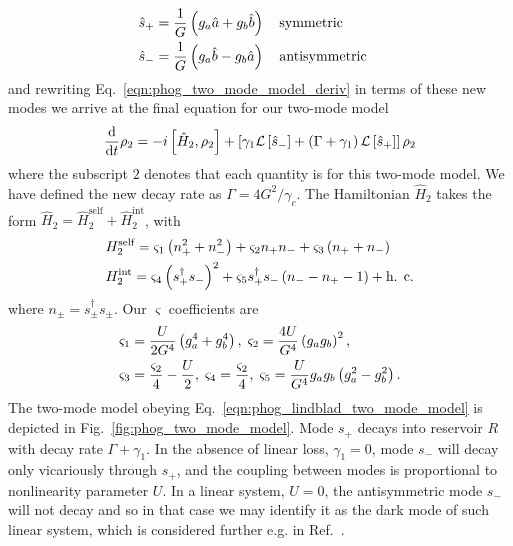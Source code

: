 \begin{align}\label{eqn:phog_rotation}
\hat{s}_+ &= \frac{1}{G} \left(g_a \hat{a} + g_b \hat{b}\right) \qq{symmetric}  \notag \\
%
\hat{s}_- &= \frac{1}{G} \left(g_a \hat{b} - g_b \hat{a}\right) \qq{antisymmetric}
\end{align}
and rewriting Eq.~\ref{eqn:phog_two_mode_model_deriv} in terms of these new modes we arrive at the final equation for our two-mode model
\begin{equation}\label{eqn:phog_lindblad_two_mode_model}
\frac{\mathrm{d}}{\mathrm{d}t} \rho_2 = - i \left[ \hat{H}_2, \rho_2 \right] + \left[ \gamma_1 \mathcal{L}\left[\hat{s}_-\right] + \left(\Gamma + \gamma_1\right) \mathcal{L}\left[\hat{s}_+\right] \right] \rho_2
\end{equation}
where the subscript $2$ denotes that each quantity is for this two-mode model. We have defined the new decay rate as $\Gamma = 4 G^2 / \gamma_c$. The Hamiltonian $\hat{H}_2$ takes the form $\hat{H}_2 = \hat{H}_2^{\text{self}} + \hat{H}_2^{\text{int}}$, with
\begin{align}
&H_2^{\text{self}} = \varsigma_1\left(n_+^2 + n_-^2\right) + \varsigma_2 n_+ n_- + \varsigma_3\left(n_+ + n_-\right) \notag \\
%
&H_2^{\text{int}} = \varsigma_4 \left(s_+^\dagger s_-\right)^2 + \varsigma_5 s_+^\dagger s_- \left(n_- - n_+ - 1\right) + \hc
\end{align}
where $n_{\pm} = s_{\pm}^\dagger s_\pm$. Our $\varsigma$ coefficients are
\begin{align}
&\varsigma_1 = \frac{U}{2 G^4} \left(g_a^4 + g_b^4\right), \; \varsigma_2 = \frac{4 U}{G^4} \left(g_a g_b\right)^2, \notag \\
%
&\varsigma_3 = \frac{\varsigma_2}{4} - \frac{U}{2}, \; \varsigma_4 = \frac{\varsigma_2}{4}, \; \varsigma_5 = \frac{U}{G^4} g_a g_b \left(g_a^2 - g_b^2\right).
\end{align}
The two-mode model obeying Eq.~\ref{eqn:phog_lindblad_two_mode_model} is depicted in Fig.~\ref{fig:phog_two_mode_model}. Mode $s_+$ decays into reservoir $R$ with decay rate $\Gamma + \gamma_1$. In the absence of linear loss, $\gamma_1=0$, mode $s_-$ will decay only vicariously through $s_+$, and the coupling between modes is proportional to nonlinearity parameter $U$. In a linear system, $U = 0$, the antisymmetric mode $s_-$ will not decay and so in that case we may identify it as the dark mode of such linear system, which is considered further e.g. in Ref.~\cite{Delanty2012}.


